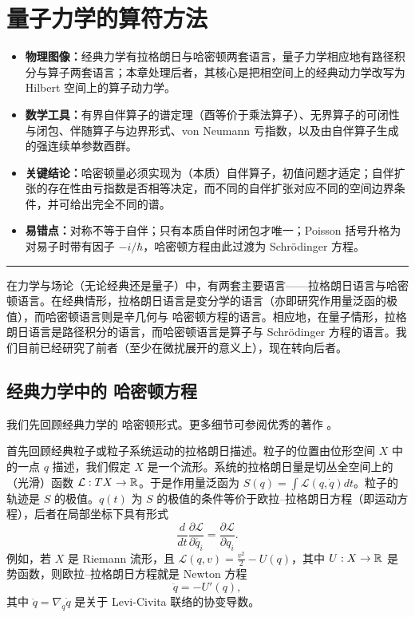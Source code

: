 \section{量子力学的算符方法}

\begin{keytakeaways}
\begin{itemize}
  \item \textbf{物理图像：}经典力学有拉格朗日与哈密顿两套语言，量子力学相应地有路径积分与算子两套语言；本章处理后者，其核心是把相空间上的经典动力学改写为 Hilbert 空间上的算子动力学。
  \item \textbf{数学工具：}有界自伴算子的谱定理（酉等价于乘法算子）、无界算子的可闭性与闭包、伴随算子与边界形式、von Neumann 亏指数，以及由自伴算子生成的强连续单参数酉群。
  \item \textbf{关键结论：}哈密顿量必须实现为（本质）自伴算子，初值问题才适定；自伴扩张的存在性由亏指数是否相等决定，而不同的自伴扩张对应不同的空间边界条件，并可给出完全不同的谱。
  \item \textbf{易错点：}对称不等于自伴；只有本质自伴时闭包才唯一；Poisson 括号升格为对易子时带有因子 $-i/\hbar$，哈密顿方程由此过渡为 Schr\"odinger 方程。
\end{itemize}
\end{keytakeaways}

\bigskip
\noindent\rule{\textwidth}{0.6pt}
\bigskip

在力学与场论（无论经典还是量子）中，有两套主要语言——拉格朗日语言与哈密顿语言。在经典情形，拉格朗日语言是变分学的语言（亦即研究作用量泛函的极值），而哈密顿语言则是辛几何与 哈密顿方程的语言。相应地，在量子情形，拉格朗日语言是路径积分的语言，而哈密顿语言是算子与 Schr\"odinger 方程的语言。我们目前已经研究了前者（至少在微扰展开的意义上），现在转向后者。

\subsection{经典力学中的 哈密顿方程}

我们先回顾经典力学的 哈密顿形式。更多细节可参阅优秀的著作 \cite{A}。

首先回顾经典粒子或粒子系统运动的拉格朗日描述。粒子的位置由位形空间 $X$ 中的一点 $q$ 描述，我们假定 $X$ 是一个流形。系统的拉格朗日量是切丛全空间上的（光滑）函数 ${\mathcal L}: TX\to
\Bbb R$。于是作用量泛函为 $S(q)=\int \mathcal
L(q,\dot{q})dt$。粒子的轨迹是 $S$ 的极值。$q(t)$ 为 $S$ 的极值的条件等价于欧拉–拉格朗日方程（即运动方程），后者在局部坐标下具有形式
$$
\frac{d}{dt}\frac{\partial \mathcal{L}}{\partial \dot{q_i}}=
\frac{\partial \mathcal{L}}{\partial q_i}.
$$
例如，若 $X$ 是 Riemann 流形，且 ${\mathcal L}(q,v)=\frac{v^2}{2}-U(q)$，其中 $U:X\to \Bbb R$ 是势函数，则欧拉–拉格朗日方程就是 Newton 方程
$$
\ddot{q}=-U'(q),
$$
其中 $\ddot{q}=\nabla_{\dot{q}}\dot q$ 是关于 Levi-Civita 联络的协变导数。

